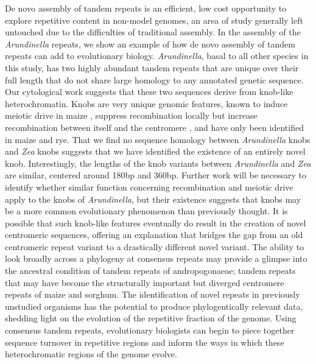 \documentclass[10pt,letterpaper]{article}
\begin{document}
De novo assembly of tandem repeats is an efficient, low cost opportunity to explore repetitive content in non-model genomes, an area of study generally left untouched due to the difficulties of traditional assembly.
In the assembly of the \emph{Arundinella} repeats, we show an example of how de novo assembly of tandem repeats can add to evolutionary biology.
\emph{Arundinella}, basal to all other species in this study, has two highly abundant tandem repeats that are unique over their full length that do not share large homology to any annotated genetic sequence.
Our cytological work suggests that these two sequences derive from knob-like heterochromatin.
Knobs are very unique genomic features, known to induce meiotic drive in maize \cite{dawe1996induction}, suppress recombination locally but increase recombination between itself and the centromere \cite{buckler1999meiotic}, and have only been identified in maize and rye\cite{gill1974giemsa}.
That we find no sequence homology between \emph{Arundinella} knobs and \emph{Zea} knobs suggests that we have identified the existence of an entirely novel knob.
Interestingly, the lengths of the knob variants between \emph{Arundinella} and \emph{Zea} are similar, centered around 180bp and 360bp.
Further work will be necessary to identify whether similar function concerning recombination and meiotic drive apply to the knobs of \emph{Arundinella}, but their existence suggests that knobs may be a more common evolutionary phenomenon than previously thought.
It is possible that such knob-like features eventually do result in the creation of novel centromeric sequences, offering an explanation that bridges the gap from an old centromeric repeat variant to a drastically different novel variant.
The ability to look broadly across a phylogeny at consensus repeats may provide a glimpse into the ancestral condition of tandem repeats of andropogonaeae; tandem repeats that may have become the structurally important but diverged centromere repeats of maize and sorghum.
The identification of novel repeats in previously unstudied organisms has the potential to produce phylogentically relevant data, shedding light on the evolution of the repetitive fraction of the genome.
Using consensus tandem repeats, evolutionary biologists can begin to piece together sequence turnover in repetitive regions \cite{henikoff2001centromere} and inform the ways in which these heterochromatic regions of the genome evolve.
\end{document}
